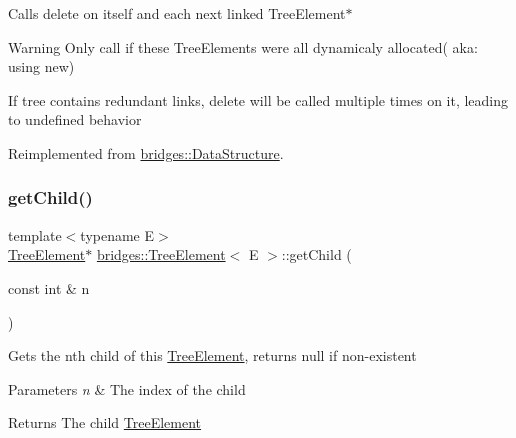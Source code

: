 Calls delete on itself and each next linked Tree\+Element$\ast$

\begin{DoxyWarning}{Warning}
Only call if these Tree\+Elements were all dynamicaly allocated( aka\+: using new) 

If tree contains redundant links, delete will be called multiple times on it, leading to undefined behavior 
\end{DoxyWarning}


Reimplemented from \hyperlink{classbridges_1_1_data_structure_ac3ad75810fd77f0ad35b9b5123d2c8f8}{bridges\+::\+Data\+Structure}.

\hypertarget{classbridges_1_1_tree_element_a14ce2d5b3a4df29c93a0c37dbe73f7a5}{}\label{classbridges_1_1_tree_element_a14ce2d5b3a4df29c93a0c37dbe73f7a5} 
\subsubsection{\texorpdfstring{get\+Child()}{getChild()}\hspace{0.1cm}{\footnotesize\ttfamily [1/2]}}
{\footnotesize\ttfamily template$<$typename E$>$ \\
\hyperlink{classbridges_1_1_tree_element}{Tree\+Element}$\ast$ \hyperlink{classbridges_1_1_tree_element}{bridges\+::\+Tree\+Element}$<$ E $>$\+::get\+Child (\begin{DoxyParamCaption}\item[{const int \&}]{n }\end{DoxyParamCaption})\hspace{0.3cm}{\ttfamily [inline]}}

Gets the nth child of this \hyperlink{classbridges_1_1_tree_element}{Tree\+Element}, returns null if non-\/existent


\begin{DoxyParams}{Parameters}
{\em n} & The index of the child \\
\hline
\end{DoxyParams}
\begin{DoxyReturn}{Returns}
The child \hyperlink{classbridges_1_1_tree_element}{Tree\+Element} 
\end{DoxyReturn}
\hypertarget{classbridges_1_1_tree_element_a23321ef35ce04dd09487824af804e27b}{}\label{classbridges_1_1_tree_element_a23321ef35ce04dd09487824af804e27b} 
